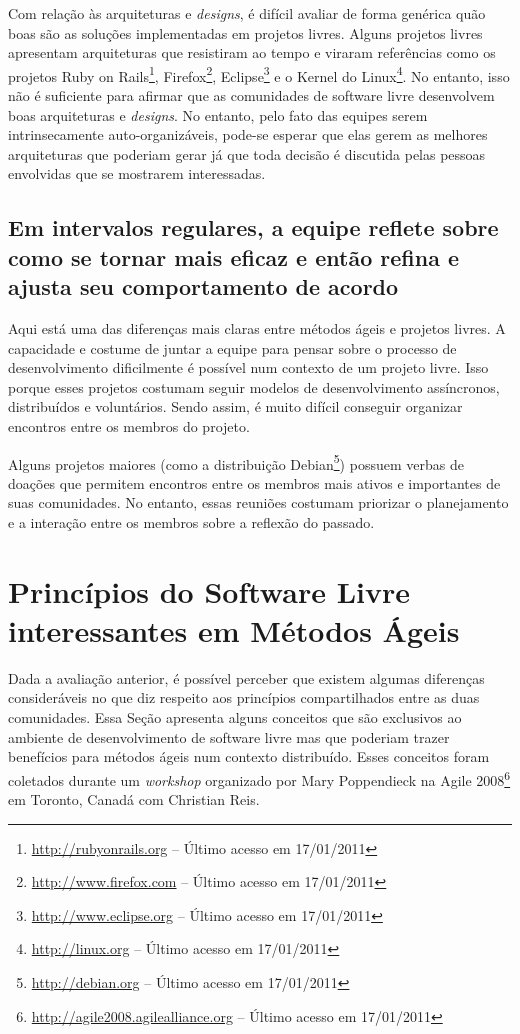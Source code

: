 Com relação às arquiteturas e \textit{designs}, é difícil avaliar de
forma genérica quão boas são as soluções implementadas em projetos
livres. Alguns projetos livres apresentam arquiteturas que resistiram
ao tempo e viraram referências como os projetos Ruby on
Rails\footnote{\url{http://rubyonrails.org} -- Último acesso em
  17/01/2011}, Firefox\footnote{\url{http://www.firefox.com} -- Último
  acesso em 17/01/2011}, Eclipse\footnote{\url{http://www.eclipse.org}
  -- Último acesso em 17/01/2011} e o Kernel do
Linux\footnote{\url{http://linux.org} -- Último acesso em
  17/01/2011}. No entanto, isso não é suficiente para afirmar que as
comunidades de software livre desenvolvem boas arquiteturas e
\textit{designs}. No entanto, pelo fato das equipes serem
intrinsecamente auto-organizáveis, pode-se esperar que elas gerem as
melhores arquiteturas que poderiam gerar já que toda decisão é
discutida pelas pessoas envolvidas que se mostrarem interessadas.

\subsection[Refletir regularmente]{Em intervalos regulares, a equipe
  reflete sobre como se tornar mais eficaz e então refina e ajusta seu
  comportamento de acordo}

Aqui está uma das diferenças mais claras entre métodos ágeis e
projetos livres. A capacidade e costume de juntar a equipe para pensar
sobre o processo de desenvolvimento dificilmente é possível num
contexto de um projeto livre. Isso porque esses projetos costumam
seguir modelos de desenvolvimento assíncronos, distribuídos e
voluntários. Sendo assim, é muito difícil conseguir organizar
encontros entre os membros do projeto.

Alguns projetos maiores (como a distribuição
Debian\footnote{\url{http://debian.org} -- Último acesso em
  17/01/2011}) possuem verbas de doações que permitem encontros entre
os membros mais ativos e importantes de suas comunidades. No entanto,
essas reuniões costumam priorizar o planejamento e a interação entre
os membros sobre a reflexão do passado.

\section{Princípios do Software Livre interessantes em Métodos Ágeis}
\label{sec:foss-over-agile}

Dada a avaliação anterior, é possível perceber que existem algumas
diferenças consideráveis no que diz respeito aos princípios
compartilhados entre as duas comunidades. Essa Seção apresenta alguns
conceitos que são exclusivos ao ambiente de desenvolvimento de
software livre mas que poderiam trazer benefícios para métodos ágeis
num contexto distribuído. Esses conceitos foram coletados durante um
\emph{workshop} organizado por Mary Poppendieck na Agile
2008\footnote{\url{http://agile2008.agilealliance.org} -- Último
  acesso em 17/01/2011} em Toronto, Canadá com Christian Reis.

